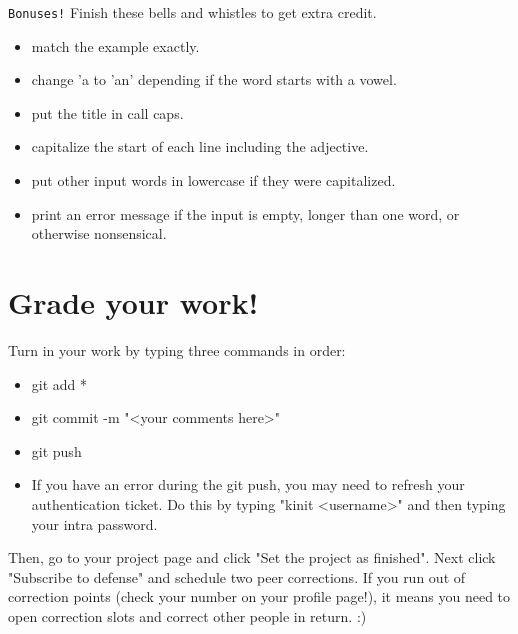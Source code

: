 \documentclass{42-en}
\begin{document}
\texttt{Bonuses!} Finish these bells and whistles to get extra credit.
\begin{itemize}
	\item match the example exactly.
	\item change 'a to 'an' depending if the word starts with a vowel.
	\item put the title in call caps.
	\item capitalize the start of each line including the adjective.
	\item put other input words in lowercase if they were capitalized.
	\item print an error message if the input is empty, longer than one word, or otherwise nonsensical.
\end{itemize}


\chapter{Grade your work!}

Turn in your work by typing three commands in order: 
\begin{itemize}
	\item git add *
	\item git commit -m "<your comments here>"
	\item git push
	\item If you have an error during the git push, you may need to refresh your authentication ticket. Do this by typing "kinit <username>" and then typing your intra password.
\end{itemize}

Then, go to your project page and click "Set the project as finished".
Next click "Subscribe to defense" and schedule two peer corrections.
If you run out of correction points (check your number on your profile page!), it means you need to open correction slots and correct other people in return. :)
\end{document}
